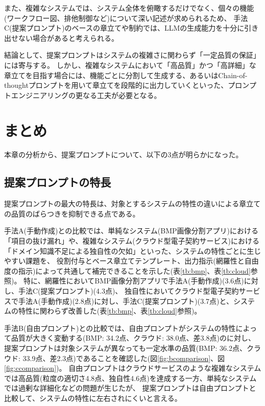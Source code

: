 また、複雑なシステムでは、システム全体を俯瞰するだけでなく、個々の機能(ワークフロー図、排他制御など)について深い記述が求められるため、
手法C(提案プロンプト)のベースの章立てや制約では、LLMの生成能力を十分に引き出せない場合があると考えられる。

結論として、提案プロンプトはシステムの複雑さに関わらず「一定品質の保証」には寄与する。
しかし、複雑なシステムにおいて「高品質」かつ「高詳細」な章立てを目指す場合には、機能ごとに分割して生成する、あるいはChain-of-thoughtプロンプト\cite{chainofthought}を用いて章立てを段階的に出力していくといった、プロンプトエンジニアリングの更なる工夫が必要となる。

\section{まとめ}

本章の分析から、提案プロンプトについて、以下の3点が明らかになった。

\subsection{提案プロンプトの特長}
\label{sec:features_of_proposed_prompt}
提案プロンプトの最大の特長は、対象とするシステムの特性の違いによる章立ての品質のばらつきを抑制できる点である。

手法A(手動作成)との比較では、単純なシステム(BMP画像分割アプリ)における「項目の抜け漏れ」や、複雑なシステム(クラウド型電子契約サービス)における「ドメイン知識不足による独自性の欠如」といった、システムの特性ごとに生じやすい課題を、
役割付与とベース章立てテンプレート、出力指示(網羅性と自由度の指示)によって共通して補完できることを示した(表\ref{tb:bmp}、表\ref{tb:cloud}参照)。
特に、網羅性においてBMP画像分割アプリで手法A(手動作成)(3.6点)に対し、手法C(提案プロンプト)(4.3点)、
独自性においてクラウド型電子契約サービスで手法A(手動作成)(2.8点)に対し、手法C(提案プロンプト)(3.7点)と、システムの特性に関わらず改善した(表\ref{tb:bmp}、表\ref{tb:cloud}参照)。

手法B(自由プロンプト)との比較では、自由プロンプトがシステムの特性によって品質が大きく変動する(BMP: 34.2点、クラウド: 38.0点、差3.8点)のに対し、
提案プロンプトは対象システムが異なっても一定水準の品質(BMP: 36.2点、クラウド: 33.9点、差2.3点)であることを確認した(図\ref{fig:bcomparison}、図\ref{fig:ccomparison})。
自由プロンプトはクラウドサービスのような複雑なシステムでは高品質(粒度の適切さ4.8点、独自性4.6点)を達成する一方、単純なシステムでは過剰な詳細化などの問題が生じたが、
提案プロンプトは自由プロンプトと比較して、システムの特性に左右されにくいと言える。

